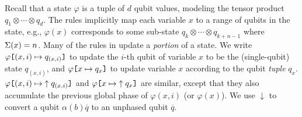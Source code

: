 Recall that a state $\varphi$ is a tuple of $d$ qubit values,
modeling the tensor product $q_1\otimes \cdots \otimes q_d$. 
The rules implicitly map each variable $x$ to a
range of qubits in the state, e.g., 
$\varphi(x)$ corresponds to some sub-state $q_k\otimes \cdots \otimes q_{k+n-1}$
where $\Omegasz(x)=n$.
%
Many of the rules in  update a \emph{portion} of a
state. We write $\app{q_{(x,i)}}{\varphi}{(x,i)}$ to update the $i$-th
qubit of variable $x$ to be the (single-qubit) state $q_{(x,i)}$, and
$\app{q_{x}}{\varphi}{x}$ to update variable $x$ according to
the qubit \emph{tuple} $q_x$.
$\app{\uparrow q_{(x,i)}}{\varphi}{(x,i)}$ and $\app{\uparrow q_{x}}{\varphi}{x}$ 
are similar, except that they also accumulate the previous global phase of $\varphi(x,i)$ (or $\varphi(x)$).
We use $\downarrow$ to convert a qubit $\alpha(b)\overline{q}$ to an unphased qubit $\overline{q}$.

